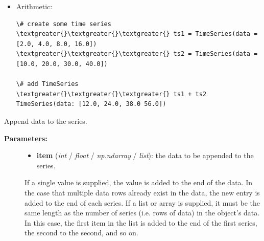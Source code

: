 \documentclass[letterpaper,10pt,english]{sphinxmanual}
\begin{document}
\begin{fulllineitems}
\begin{description}
\begin{itemize}
\begin{Verbatim}[commandchars=\\\{\}]
\# slicing
\textgreater{}\textgreater{}\textgreater{} ts[2:4]
np.array([8.0, 16.0])

\# create a TimeSeries with multiple series
\textgreater{}\textgreater{}\textgreater{} ts = TimeSeries(data = [ [2.0, 4.0, 6.0],
\textgreater{}\textgreater{}\textgreater{}                          [1.0, 2.0, 3.0],
\textgreater{}\textgreater{}\textgreater{}                          [5.0, 10.0, 15.0] ])

\# regular indexing
\textgreater{}\textgreater{}\textgreater{} ts[1]
np.array([ 4.0,
           2.0,
           10.0 ])

\# index a series using a string
\textgreater{}\textgreater{}\textgreater{} ts['1']
TimeSeries(data: [1.0, 2.0, 3.0])
\end{Verbatim}

\item {} 
Arithmetic:

\begin{Verbatim}[commandchars=\\\{\}]
\# create some time series
\textgreater{}\textgreater{}\textgreater{} ts1 = TimeSeries(data = [2.0, 4.0, 8.0, 16.0])
\textgreater{}\textgreater{}\textgreater{} ts2 = TimeSeries(data = [10.0, 20.0, 30.0, 40.0])

\# add TimeSeries
\textgreater{}\textgreater{}\textgreater{} ts1 + ts2
TimeSeries(data: [12.0, 24.0, 38.0 56.0])
\end{Verbatim}

\end{itemize}

\end{description}

\begin{fulllineitems}
\label{data_structures:time_series.TimeSeries.append}
Append data to the series.
\begin{description}
\item[{\textbf{Parameters:}}] \leavevmode\begin{itemize}
\item {} 
\textbf{item} (\emph{int} / \emph{float} / \emph{np.ndarray} / \emph{list}): the data to be appended to the series.

\end{itemize}

If a single value is supplied, the value is added to the end of the data. In the case that multiple data rows already exist in the data, the new entry is added to the end of each series.
If a list or array is supplied, it must be the same length as the number of series (i.e. rows of data) in the object's data. In this case, the first item in the list is added to the end of the first series, the second to the second, and so on.


\end{description}
\end{fulllineitems}
\end{fulllineitems}
\end{document}
